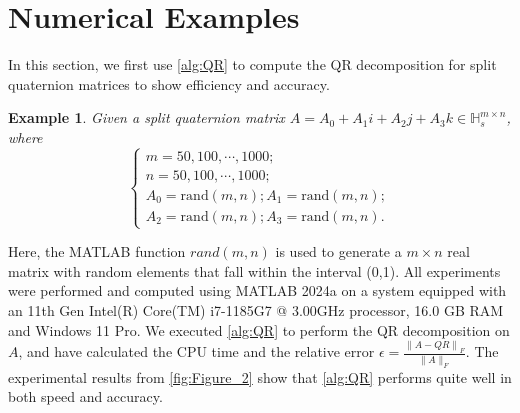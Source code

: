 \documentclass[conference]{IEEEtran}
\newtheorem{example}[theorem]{Example}
\numberwithin{equation}{section}
\begin{document}
\section{Numerical Examples}

In this section, we first use \cref{alg:QR} to compute the QR decomposition for split quaternion matrices to show  efficiency and accuracy.
\begin{example}
    Given a split quaternion matrix $A = A_{0}+A_{1}i+A_{2}j+A_{3}k\in \mathbb{H}_s^{m\times n}$, where
    \begin{equation}
       \begin{cases}
            m = 50,100,\cdots,1000;\\
            n = 50,100,\cdots,1000;  \\
            A_{0}=\text{rand}(m,n);
            A_{1}=\text{rand}(m,n); \\
            A_{2}=\text{rand}(m,n);
            A_{3}=\text{rand}(m,n).
        \end{cases} \label{eq:example2}
    \end{equation}
\end{example}
Here, the MATLAB function $rand(m,n)$ is used to generate a $m \times n$ real matrix with random elements that fall within the interval (0,1).  All experiments were performed and computed using MATLAB 2024a on a system equipped with an 11th Gen Intel(R) Core(TM) i7-1185G7 @ 3.00GHz processor, 16.0 GB RAM and Windows 11 Pro. We executed \cref{alg:QR} to perform the QR decomposition on $A$, and have calculated the CPU time and the relative error
$\epsilon = \frac{\left\|A - Q R\right\|_{F}}{\|A\|_{F}}.$
The experimental results from \cref{fig:Figure_2} show that \cref{alg:QR} performs quite well in both speed and accuracy. 
\end{document}
